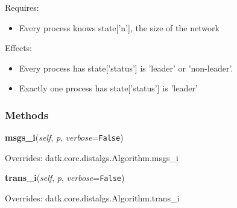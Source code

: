 Requires:

\begin{itemize}
\setlength{\parskip}{0.6ex}
  \item Every process knows state['n'], the size of the network

\end{itemize}

Effects:

\begin{itemize}
\setlength{\parskip}{0.6ex}
  \item Every process has state['status'] is 'leader' or 'non-leader'.

  \item Exactly one process has state['status'] is 'leader'

\end{itemize}



  \subsubsection{Methods}

    \vspace{0.5ex}

\hspace{.8\funcindent}\begin{boxedminipage}{\funcwidth}

    \raggedright \textbf{msgs\_i}(\textit{self}, \textit{p}, \textit{verbose}={\tt False})

\setlength{\parskip}{2ex}
\setlength{\parskip}{1ex}
      Overrides: datk.core.distalgs.Algorithm.msgs\_i

    \end{boxedminipage}

    \vspace{0.5ex}

\hspace{.8\funcindent}\begin{boxedminipage}{\funcwidth}

    \raggedright \textbf{trans\_i}(\textit{self}, \textit{p}, \textit{verbose}={\tt False})

\setlength{\parskip}{2ex}
\setlength{\parskip}{1ex}
      Overrides: datk.core.distalgs.Algorithm.trans\_i

    \end{boxedminipage}

